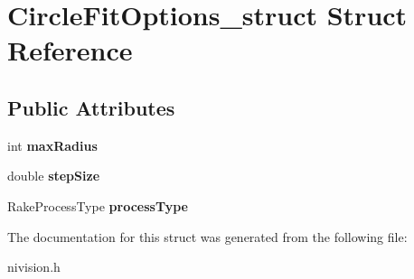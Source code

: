 \hypertarget{structCircleFitOptions__struct}{
\section{CircleFitOptions\_\-struct Struct Reference}
\label{structCircleFitOptions__struct}
}
\subsection*{Public Attributes}
\begin{DoxyCompactItemize}
\item 
\hypertarget{structCircleFitOptions__struct_a0edad5f17cba7fca1c4965e9d4de5f91}{
int {\bfseries maxRadius}}
\label{structCircleFitOptions__struct_a0edad5f17cba7fca1c4965e9d4de5f91}

\item 
\hypertarget{structCircleFitOptions__struct_a224a86ababb833890fbf4d1bdcb7d8c1}{
double {\bfseries stepSize}}
\label{structCircleFitOptions__struct_a224a86ababb833890fbf4d1bdcb7d8c1}

\item 
\hypertarget{structCircleFitOptions__struct_a9dee1249911f722ae62e0f701086131e}{
RakeProcessType {\bfseries processType}}
\label{structCircleFitOptions__struct_a9dee1249911f722ae62e0f701086131e}

\end{DoxyCompactItemize}


The documentation for this struct was generated from the following file:\begin{DoxyCompactItemize}
\item 
nivision.h\end{DoxyCompactItemize}
